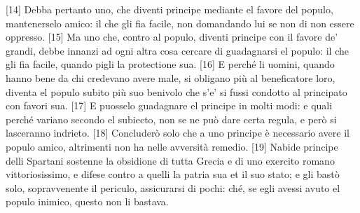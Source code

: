 {[}14{]} Debba pertanto uno, che diventi principe mediante el favore del
populo, mantenerselo amico: il che gli fia facile, non domandando lui se
non di non essere oppresso. {[}15{]} Ma uno che, contro al populo,
diventi principe con il favore de' grandi, debbe innanzi ad ogni altra
cosa cercare di guadagnarsi el populo: il che gli fia facile, quando
pigli la protectione sua. {[}16{]} E perché li uomini, quando hanno bene
da chi credevano avere male, si obligano più al beneficatore loro,
diventa el populo subito più suo benivolo che s'e' si fussi condotto al
principato con favori sua. {[}17{]} E puosselo guadagnare el principe in
molti modi: e quali perché variano secondo el subiecto, non se ne può
dare certa regula, e però si lasceranno indrieto. {[}18{]} Concluderò
solo che a uno principe è necessario avere il populo amico, altrimenti
non ha nelle avversità remedio. {[}19{]} Nabide principe delli Spartani
sostenne la obsidione di tutta Grecia e di uno exercito romano
vittoriosissimo, e difese contro a quelli la patria sua et il suo stato;
e gli bastò solo, sopravvenente il periculo, assicurarsi di pochi: ché,
se egli avessi avuto el populo inimico, questo non li bastava.

\quebra


